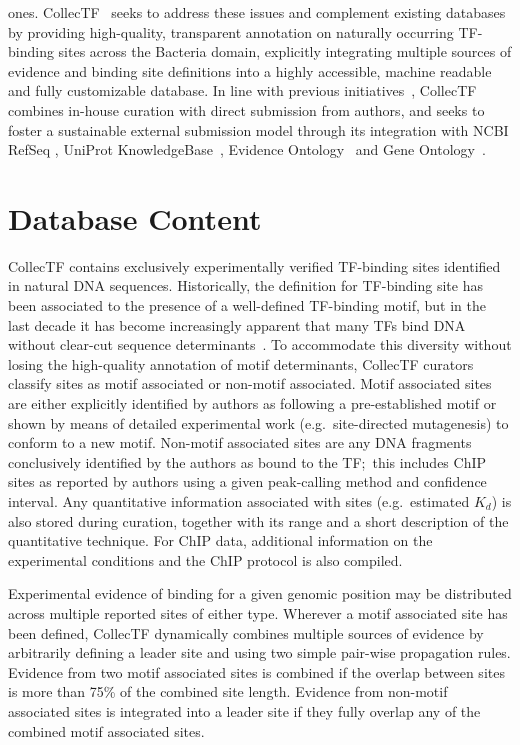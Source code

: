 ones. CollecTF~\cite{kilic2013collectf} seeks to address these issues and
complement existing databases by providing high-quality, transparent annotation
on naturally occurring TF-binding sites across the Bacteria domain, explicitly
integrating multiple sources of evidence and binding site definitions into a
highly accessible, machine readable and fully customizable database. In line
with previous initiatives~\cite{griffith2008oreganno}, CollecTF combines
in-house curation with direct submission from authors, and seeks to foster a
sustainable external submission model through its integration with NCBI RefSeq
\cite{pruitt2007ncbi}, UniProt KnowledgeBase~\cite{uniprot2014uniprot},
Evidence Ontology~\cite{chibucos2014standardized} and Gene
Ontology~\cite{gene2004gene}.

\section{Database Content}

CollecTF contains exclusively experimentally verified TF-binding sites
identified in natural DNA sequences. Historically, the definition for
TF-binding site has been associated to the presence of a well-defined
TF-binding motif, but in the last decade it has become increasingly apparent
that many TFs bind DNA without clear-cut sequence
determinants~\cite{hijum2009mechanisms, paul2007integration,
  barnard2004regulation}. To accommodate this diversity without losing the
high-quality annotation of motif determinants, CollecTF curators classify sites
as motif associated or non-motif associated. Motif associated sites are either
explicitly identified by authors as following a pre-established motif or shown
by means of detailed experimental work (e.g.\ site-directed mutagenesis) to
conform to a new motif. Non-motif associated sites are any DNA fragments
conclusively identified by the authors as bound to the TF;\ this includes ChIP
sites as reported by authors using a given peak-calling method and confidence
interval. Any quantitative information associated with sites (e.g.\ estimated
$K_d$) is also stored during curation, together with its range and a short
description of the quantitative technique. For ChIP data, additional
information on the experimental conditions and the ChIP protocol is also
compiled.

Experimental evidence of binding for a given genomic position may be
distributed across multiple reported sites of either type. Wherever a motif
associated site has been defined, CollecTF dynamically combines multiple
sources of evidence by arbitrarily defining a leader site and using two simple
pair-wise propagation rules. Evidence from two motif associated sites is
combined if the overlap between sites is more than 75\% of the combined site
length. Evidence from non-motif associated sites is integrated into a leader
site if they fully overlap any of the combined motif associated sites.

